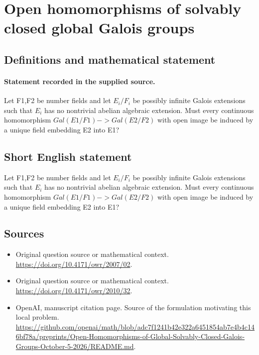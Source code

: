 \documentclass[11pt]{article}
\begin{document}
\section*{Open homomorphisms of solvably closed global Galois groups}\label{statement}
\subsection{Definitions and mathematical statement}
\paragraph{Statement recorded in the supplied source.}
Let F1,F2 be number fields and let $E_i/F_i$ be possibly infinite Galois extensions such that $E_i$ has no nontrivial abelian algebraic extension. Must every continuous homomorphism $Gal(E1/F1)->Gal(E2/F2)$ with open image be induced by a unique field embedding E2 into E1?
\subsection{Short English statement}
Let F1,F2 be number fields and let $E_i/F_i$ be possibly infinite Galois extensions such that $E_i$ has no nontrivial abelian algebraic extension. Must every continuous homomorphism $Gal(E1/F1)->Gal(E2/F2)$ with open image be induced by a unique field embedding E2 into E1?
\subsection{Sources}
\begin{itemize}
\item[S1] Original question source or mathematical context.
\url{https://doi.org/10.4171/owr/2007/02}.
\item[S2] Original question source or mathematical context.
\url{https://doi.org/10.4171/owr/2010/32}.
\item[S3] OpenAI, manuscript citation page. Source of the formulation motivating this local problem.
\url{https://github.com/openai/math/blob/adc7f1241b42e322a6451854ab7e4b4c146bf78a/preprints/Open-Homomorphisms-of-Global-Solvably-Closed-Galois-Groups-October-5-2026/README.md}.
\end{itemize}
\end{document}
